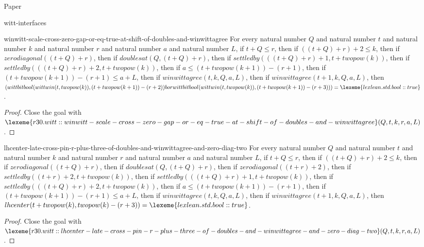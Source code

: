 \begin{lexlean}{Paper}
\begin{section}{witt-interfaces}
  \begin{theorem}{winwitt-scale-cross-zero-gap-or-eq-true-at-shift-of-doubles-and-winwittagree}
  For every natural number \(Q\) and natural number \(t\) and natural number \(k\) and natural number \(r\) and natural number \(a\) and natural number \(L\), if \(t + Q ≤ r\), then if \(((t + Q) + r) + 2 ≤ k\), then if \(zerodiagonal((t + Q) + r)\), then if \(doublesat(Q, (t + Q) + r)\), then if \(settledby(((t + Q) + r) + 1, t + twopow(k))\), then if \(settledby(((t + Q) + r) + 2, t + twopow(k))\), then if \(a ≤ (t + twopow(k + 1)) - (r + 1)\), then if \((t + twopow(k + 1)) - (r + 1) ≤ a + L\), then if \(winwittagree(t, k, Q, a, L)\), then if \(winwittagree(t + 1, k, Q, a, L)\), then \((wittbitbool(wittwin(t, twopow(k)), (t + twopow(k + 1)) - (r + 2)) bor wittbitbool(wittwin(t, twopow(k)), (t + twopow(k + 1)) - (r + 3))) = \lexeme{lexlean.std.bool::true}\).
  \begin{proof}
  Close the goal with \(\lexeme{r30.witt::winwitt-scale-cross-zero-gap-or-eq-true-at-shift-of-doubles-and-winwittagree}(Q, t, k, r, a, L)\).
  \end{proof}
  \end{theorem}

  \begin{theorem}{lhcenter-late-cross-pin-r-plus-three-of-doubles-and-winwittagree-and-zero-diag-two}
  For every natural number \(Q\) and natural number \(t\) and natural number \(k\) and natural number \(r\) and natural number \(a\) and natural number \(L\), if \(t + Q ≤ r\), then if \(((t + Q) + r) + 2 ≤ k\), then if \(zerodiagonal((t + Q) + r)\), then if \(doublesat(Q, (t + Q) + r)\), then if \(zerodiagonal((t + r) + 2)\), then if \(settledby((t + r) + 2, t + twopow(k))\), then if \(settledby(((t + Q) + r) + 1, t + twopow(k))\), then if \(settledby(((t + Q) + r) + 2, t + twopow(k))\), then if \(a ≤ (t + twopow(k + 1)) - (r + 1)\), then if \((t + twopow(k + 1)) - (r + 1) ≤ a + L\), then if \(winwittagree(t, k, Q, a, L)\), then if \(winwittagree(t + 1, k, Q, a, L)\), then \(lhcenter(t + twopow(k), twopow(k) - (r + 3)) = \lexeme{lexlean.std.bool::true}\).
  \begin{proof}
  Close the goal with \(\lexeme{r30.witt::lhcenter-late-cross-pin-r-plus-three-of-doubles-and-winwittagree-and-zero-diag-two}(Q, t, k, r, a, L)\).
  \end{proof}
  \end{theorem}


\end{section}
\end{lexlean}

